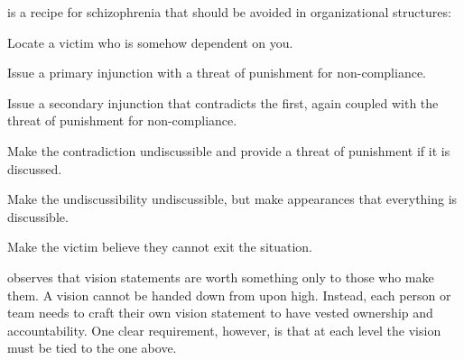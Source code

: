 \documentclass{tufte-handout}
\begin{document}
\newpage

%
is a recipe for schizophrenia that should be avoided in organizational
structures:
\begin{compactenum}
 \item Locate a victim who is somehow dependent on you.
 \item Issue a primary injunction with a threat of punishment for
       non-compliance.
 \item Issue a secondary injunction that contradicts the first, again
       coupled with the threat of punishment for non-compliance.
 \item Make the contradiction undiscussible and provide a threat of
       punishment if it is discussed.
 \item Make%
       the undiscussibility undiscussible, but make appearances
       that everything is discussible.
 \item Make the victim believe they cannot exit the situation.
\end{compactenum}

 observes that vision statements are worth something
only to those who make them.%
A vision cannot be handed down from upon high.
Instead, each person or team needs to craft their own vision statement
to have vested ownership and accountability.
One clear requirement, however, is that at each level the vision must be
tied to the one above.
\end{document}
